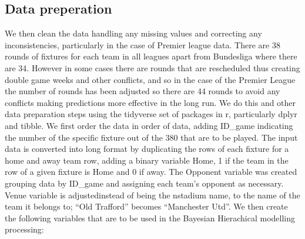 \documentclass[
]{article}
\begin{document}
\hypertarget{data-preperation}{%
\subsection{Data preperation}\label{data-preperation}}

We then clean the data handling any missing values and correcting any
inconsistencies, particularly in the case of Premier league data. There
are 38 rounds of fixtures for each team in all leagues apart from
Bundesliga where there are 34. However in some cases there are rounds
that are rescheduled thus creating double game weeks and other
conflicts, and so in the case of the Premier League the number of rounds
has been adjusted so there are 44 rounds to avoid any conflicts making
predictions more effective in the long run. We do this and other data
preparation steps using the tidyverse set of packages in r, particularly
dplyr and tibble. We first order the data in order of data, adding
ID\_game indicating the number of the specific fixture out of the 380
that are to be played. The input data is converted into long format by
duplicating the rows of each fixture for a home and away team row,
adding a binary variable Home, 1 if the team in the row of a given
fixture is Home and 0 if away. The Opponent variable was created
grouping data by ID\_game and assigning each team's opponent as
necessary. Venue variable is adjustedinstead of being the nstadium name,
to the name of the team it belongs to; ``Old Trafford'' becomes
``Manchester Utd''. We then create the following variables that are to
be used in the Bayesian Hierachical modelling processing:
\end{document}
